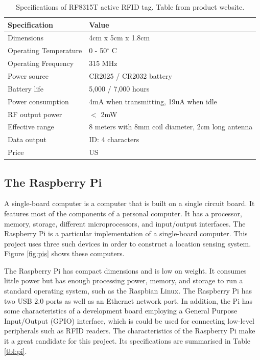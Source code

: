 \begin{table}[h]
	\centering
	\begin{tabular}{ | m{4cm} || m{7cm} | }
		\hline
		\textbf{Specification}	& \textbf{Value} \\ \hline
		Dimensions				& 4cm x 5cm x 1.8cm \\ \hline
		Operating Temperature	& 0 - 50$^\circ$ C	\\ \hline
		Operating Frequency		& 315 MHz	\\ \hline
		Power source			& CR2025 / CR2032 battery \\ \hline
		Battery life			& 5,000 / 7,000 hours \\ \hline
		Power consumption		& 4mA when transmitting, 19uA when idle \\ \hline
		RF output power			& $<$ 2mW \\ \hline
		Effective range			& 8 meters with 8mm coil diameter, 2cm long antenna \\ \hline
		Data output				& ID: 4 characters \\ \hline
		Price					& US \textdollar 19.95 \\ \hline
	\end{tabular}
	\caption{Specifications of RF8315T active RFID tag. Table from product website\protect\footnotemark.}
	\label{tbl:tag}
\end{table}


\subsection{The Raspberry Pi}

A single-board computer is a computer that is built on a single circuit board. It features most of the components of a personal computer. It has a processor, memory, storage, different microprocessors, and input/output interfaces. The Raspberry Pi is a particular implementation of a single-board computer. This project uses three such devices in order to construct a location sensing system. Figure \ref{fig:pis} shows these computers.

The Raspberry Pi has compact dimensions and is low on weight. It consumes little power but has enough processing power, memory, and storage to run a standard operating system, such as the Raspbian Linux. The Raspberry Pi has two USB 2.0 ports as well as an Ethernet network port. In addition, the Pi has some characteristics of a development board employing a General Purpose Input/Output (GPIO) interface, which is could be used for connecting low-level peripherals such as RFID readers. The characteristics of the Raspberry Pi make it a great candidate for this project. Its specifications are summarised in Table \ref{tbl:pi}.

